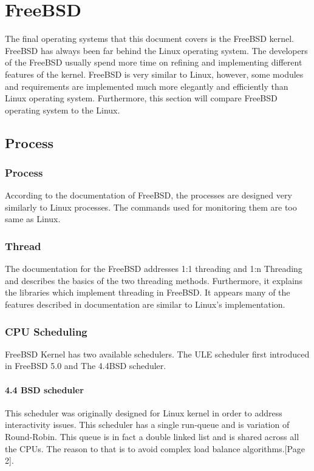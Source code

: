 \documentclass[journal,10pt,onecolumn,compsoc,letterpaper,draftclsnofoot,table,xcdraw]{IEEEtran} \usepackage[margin=0.75in]{geometry}
\begin{document}
\section{FreeBSD}
\noindent The final operating systems that this document covers is the FreeBSD kernel. FreeBSD has always been far behind the Linux operating system. The developers of the FreeBSD usually spend more time on refining and implementing different features of the kernel. FreeBSD is very similar to Linux, however, some modules and requirements are implemented much more elegantly and efficiently than Linux operating system. Furthermore, this section will compare FreeBSD operating system to the Linux.
\subsection{Process}
\subsubsection{Process}
\noindent According to the documentation of FreeBSD, the processes are designed very similarly to Linux processes. The commands used for monitoring them are too same as Linux.\cite{freebsdPD} 
\subsubsection{Thread}
\noindent  The documentation for the FreeBSD addresses 1:1 threading and 1:n Threading and describes the basics of the two threading methods. \cite{freebsdalook} Furthermore, it explains the libraries which implement threading in FreeBSD. It appears many of the features described in documentation are similar to Linux's implementation.
\subsubsection{CPU Scheduling}
\noindent FreeBSD Kernel has two available schedulers. The ULE scheduler first introduced in FreeBSD 5.0 and The 4.4BSD scheduler.
\paragraph{4.4 BSD scheduler} This scheduler was originally designed for Linux kernel in order to address interactivity issues. This scheduler has a single run-queue and is variation of Round-Robin. This queue is in fact a double linked list and is shared across all the CPUs. The reason to that is to avoid complex load balance algorithms.\cite{freebsdpdf}[Page 2].
\end{document}
